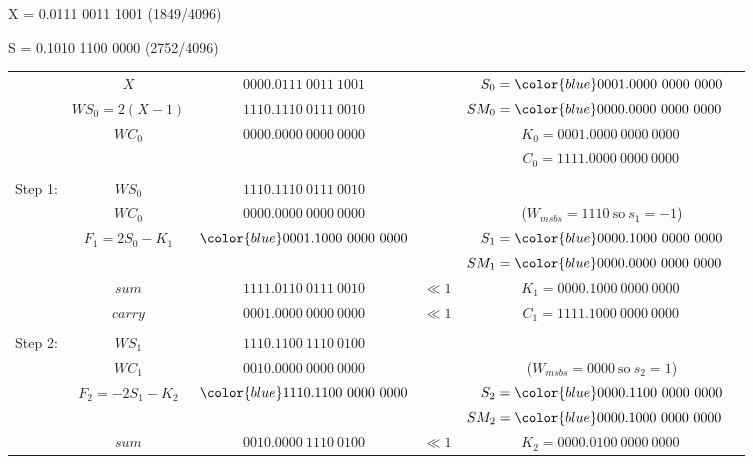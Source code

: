 \documentclass[12pt]{article}
\begin{document}
X = 0.0111 0011 1001 (1849/4096)

S = 0.1010 1100 0000 (2752/4096)
{\small
\begin{center}
\begin{tabular}{ccccc}
            &$X             $&$         0000.0111\ 0011\ 1001   $&          &$S_0={\color{blue}0001}.0000\ 0000\ 0000$\\
            &$WS_0=2(X-1)   $&$         1110.1110\ 0111\ 0010   $&          &$SM_0={\color{blue}0000}.0000\ 0000\ 0000\phantom{M}$\\
            &$WC_0          $&$         0000.0000\ 0000\ 0000   $&          &$K_0=0001.0000\ 0000\ 0000\ $\\
            &                &                                   &          &$C_0=1111.0000\ 0000\ 0000\,$\\
    \hdashline\\
    Step 1: &$WS_0          $&$         1110.1110\ 0111\ 0010   $&          &\\
            &$WC_0          $&$         0000.0000\ 0000\ 0000   $&          &($W_{msbs}=1110\ \text{so}\ s_1=-1$)\\
            &$F_1=2S_0-K_1 $&${\color{blue}0001.1}000\ 0000\ 0000$&          &$S_1={\color{blue}0000.1}000\ 0000\ 0000$\\
            &                &                                   &          &$SM_1={\color{blue}0000.0}000\ 0000\ 0000\phantom{M}$\\
    \cline{2-3}
            &$sum           $&$         1111.0110\ 0111\ 0010   $&$\ll1    $&$K_1=0000.1000\ 0000\ 0000\ $\\
            &$carry         $&$         0001.0000\ 0000\ 0000   $&$\ll1    $&$C_1=1111.1000\ 0000\ 0000\,$\\
    \hdashline\\    
    Step 2: &$WS_1          $&$         1110.1100\ 1110\ 0100   $&          &\\
            &$WC_1          $&$         0010.0000\ 0000\ 0000   $&          &($W_{msbs}=0000\ \text{so}\ s_2=1$)\\
            &$F_2=-2S_1-K_2$&${\color{blue}1110.11}00\ 0000\ 0000$&          &$S_2={\color{blue}0000.11}00\ 0000\ 0000$\\
            &                &                                   &          &$SM_2={\color{blue}0000.10}00\ 0000\ 0000\phantom{M}$\\
    \cline{2-3}
            &$sum           $&$         0010.0000\ 1110\ 0100   $&$\ll1    $&$K_2=0000.0100\ 0000\ 0000\ $\\

\end{tabular}
\end{center}}
\end{document}
